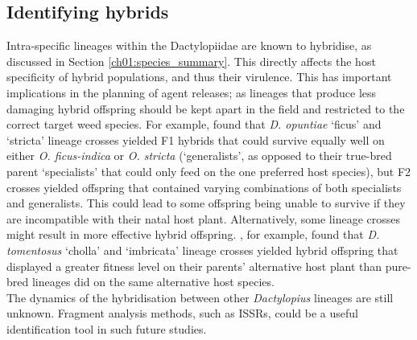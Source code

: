 \subsection{Identifying hybrids}
Intra-specific lineages within the Dactylopiidae are known to hybridise, as discussed in Section \ref{ch01:species_summary}. This directly affects the host specificity of hybrid populations, and thus their virulence. This has important implications in the planning of agent releases; as lineages that produce less damaging hybrid offspring should be kept apart in the field and restricted to the correct target weed species. For example, \citet{Hoffmann2002BiologicalBiotypes} found that \textit{D. opuntiae} `ficus' and `stricta' lineage crosses yielded F1 hybrids that could survive equally well on either \textit{O. ficus-indica} or \textit{O. stricta} (`generalists', as opposed to their true-bred parent `specialists' that could only feed on the one preferred host species), but F2 crosses yielded offspring that contained varying combinations of both specialists and generalists. This could lead to some offspring being unable to survive if they are incompatible with their natal host plant. 
Alternatively, some lineage crosses might result in more effective hybrid offspring. \citet{Mathenge2010a}, for example, found that \textit{D. tomentosus} `cholla' and `imbricata' lineage crosses yielded hybrid offspring that displayed a greater fitness level on their parents' alternative host plant than pure-bred lineages did on the same alternative host species. \\
The dynamics of the hybridisation between other \textit{Dactylopius} lineages are still unknown.
Fragment analysis methods, such as ISSRs, could be a useful identification tool in such future studies.

